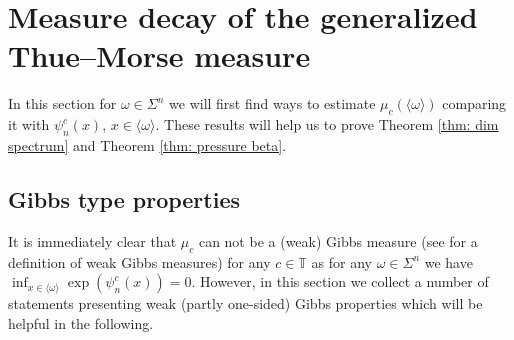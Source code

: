 \documentclass[11pt,reqno]{amsart}
\theoremstyle{plain}
\theoremstyle{definition}
\newcommand{\T}{{\mathbb T}}
\newcommand{\ts}{\hspace{0.5pt}}
\begin{document}
\section{Measure decay of the generalized Thue{\ts}--Morse measure}\label{sec:MeasureDec}

In this section for $\omega\in \Sigma^n$  we will first find ways to estimate $\mu_c(\langle \omega\rangle)$ comparing it with $\psi^c_{n}(x)$, $x\in  \langle \omega\rangle$. These results will help us to prove Theorem \ref{thm: dim spectrum} and Theorem \ref{thm: pressure beta}.


\subsection{Gibbs type properties}\label{subsec:Gibbs-type}

It is immediately clear that $\mu_c$ can not be a (weak) Gibbs measure (see \cite{K01} for a definition of weak Gibbs measures) for any $c\in \T$ as for any $\omega \in \Sigma^n$ we have $\inf_{x\in \langle \omega \rangle}\exp(\psi_n^c(x))=0$.
However, in this section we collect a number of statements presenting weak (partly one-sided) Gibbs properties which will be helpful in the following.
\end{document}
